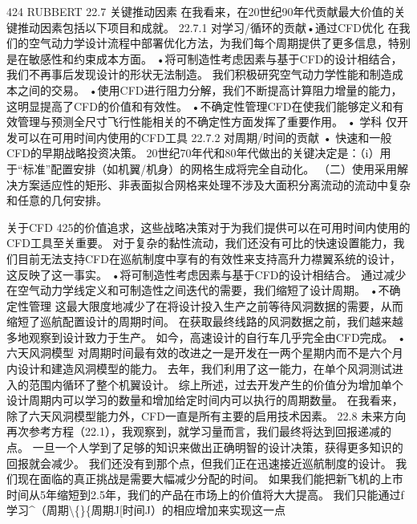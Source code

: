 \documentclass[UTF8,11pt,a4paper,openany,fontset=fandol]{ctexbook}
\begin{document}
424 RUBBERT 22.7 关键推动因素 在我看来，在20世纪90年代贡献最大价值的关键推动因素包括以下项目和成就。 22.7.1 对学习/循环的贡献•通过CFD优化 在我们的空气动力学设计流程中部署优化方法，为我们每个周期提供了更多信息，特别是在敏感性和约束成本方面。 •将可制造性考虑因素与基于CFD的设计相结合，我们不再事后发现设计的形状无法制造。 我们积极研究空气动力学性能和制造成本之间的交易。 •使用CFD进行阻力分解，我们不断提高计算阻力增量的能力，这明显提高了CFD的价值和有效性。 •不确定性管理CFD在使我们能够定义和有效管理与预测全尺寸飞行性能相关的不确定性方面发挥了重要作用。 • 学科 仅开发可以在可用时间内使用的CFD工具 22.7.2 对周期/时间的贡献 • 快速和一般CFD的早期战略投资决策。 20世纪70年代和80年代做出的关键决定是：（i）用于“标准”配置安排（如机翼/机身）的网格生成将完全自动化。 （二）使用采用解决方案适应性的矩形、非表面拟合网格来处理不涉及大面积分离流动的流动中复杂和任意的几何安排。

关于CFD 425的价值追求，这些战略决策对于为我们提供可以在可用时间内使用的CFD工具至关重要。 对于复杂的黏性流动，我们还没有可比的快速设置能力，我们目前无法支持CFD在巡航制度中享有的有效性来支持高升力襟翼系统的设计，这反映了这一事实。 •将可制造性考虑因素与基于CFD的设计相结合。 通过减少在空气动力学线定义和可制造性之间迭代的需要，我们缩短了设计周期。 •不确定性管理 这最大限度地减少了在将设计投入生产之前等待风洞数据的需要，从而缩短了巡航配置设计的周期时间。 在获取最终线路的风洞数据之前，我们越来越多地观察到设计致力于生产。 如今，高速设计的自行车几乎完全由CFD完成。 •六天风洞模型 对周期时间最有效的改进之一是开发在一两个星期内而不是六个月内设计和建造风洞模型的能力。 去年，我们利用了这一能力，在单个风洞测试进入的范围内循环了整个机翼设计。 综上所述，过去开发产生的价值分为增加单个设计周期内可以学习的数量和增加给定时间内可以执行的周期数量。 在我看来，除了六天风洞模型能力外，CFD一直是所有主要的启用技术因素。 22.8 未来方向 再次参考方程（22.1），我观察到，就学习量而言，我们最终将达到回报递减的点。 一旦一个人学到了足够的知识来做出正确明智的设计决策，获得更多知识的回报就会减少。 我们还没有到那个点，但我们正在迅速接近巡航制度的设计。 我们现在面临的真正挑战是需要大幅减少分配的时间。 如果我们能把新飞机的上市时间从5年缩短到2.5年，我们的产品在市场上的价值将大大提高。 我们只能通过f学习\textasciicircum{}（周期\textbackslash\{\}\{周期J[时间J）的相应增加来实现这一点
\end{document}
